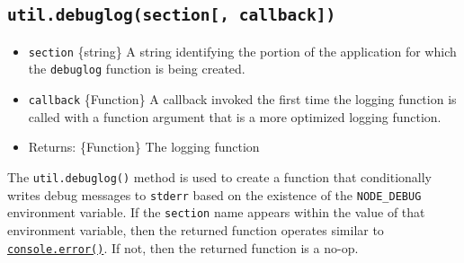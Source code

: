 \begin{Shaded}
\begin{Highlighting}[]
 \NormalTok{() \{}
   \NormalTok{(}\NormalTok{)}\OperatorTok{;}
\NormalTok{\}}
\OperatorTok{=}\OperatorTok{;}

\OperatorTok{,}\KeywordTok{=\textgreater{}}\NormalTok{ \{}
\OperatorTok{\&\&} \OperatorTok{,} \NormalTok{) }\OperatorTok{\&\&} \OperatorTok{===} \OperatorTok{;}  
\NormalTok{\})}\OperatorTok{;}
\end{Highlighting}
\end{Shaded}

\subsection{\texorpdfstring{\texttt{util.debuglog(section{[},\ callback{]})}}{util.debuglog(section{[}, callback{]})}}\label{util.debuglogsection-callback}

\begin{itemize}
\tightlist
\item
  \texttt{section} \{string\} A string identifying the portion of the
  application for which the \texttt{debuglog} function is being created.
\item
  \texttt{callback} \{Function\} A callback invoked the first time the
  logging function is called with a function argument that is a more
  optimized logging function.
\item
  Returns: \{Function\} The logging function
\end{itemize}

The \texttt{util.debuglog()} method is used to create a function that
conditionally writes debug messages to \texttt{stderr} based on the
existence of the \texttt{NODE\_DEBUG} environment variable. If the
\texttt{section} name appears within the value of that environment
variable, then the returned function operates similar to
\href{console.md\#consoleerrordata-args}{\texttt{console.error()}}. If
not, then the returned function is a no-op.

